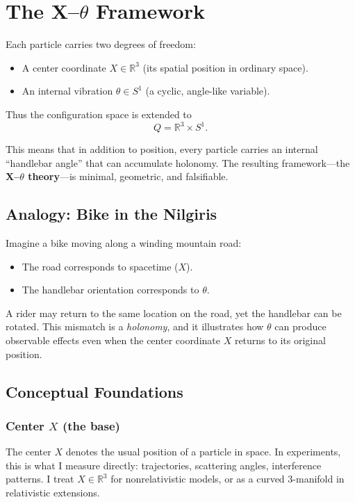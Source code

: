 \section{The X--$\theta$ Framework}

Each particle carries two degrees of freedom:
\begin{itemize}
  \item A center coordinate $X \in \mathbb{R}^3$ (its spatial position in ordinary space).
  \item An internal vibration $\theta \in S^1$ (a cyclic, angle-like variable).
\end{itemize}

Thus the configuration space is extended to
\begin{equation}
Q = \mathbb{R}^3 \times S^1 .
\end{equation}

This means that in addition to position, every particle carries an internal ``handlebar angle'' 
that can accumulate holonomy. The resulting framework---the \textbf{X--$\theta$ theory}---is minimal, geometric, 
and falsifiable.

\subsection{Analogy: Bike in the Nilgiris}
Imagine a bike moving along a winding mountain road:
\begin{itemize}
  \item The road corresponds to spacetime ($X$).
  \item The handlebar orientation corresponds to $\theta$.
\end{itemize}
A rider may return to the same location on the road, yet the handlebar can be rotated.
This mismatch is a \emph{holonomy}, and it illustrates how $\theta$ can produce observable
effects even when the center coordinate $X$ returns to its original position.  

\subsection{Conceptual Foundations}

\subsubsection*{Center $X$ (the base)}
The center $X$ denotes the usual position of a particle in space. In experiments, this is what
I measure directly: trajectories, scattering angles, interference patterns.  
I treat $X \in \mathbb{R}^3$ for nonrelativistic models, or as a curved 3-manifold in relativistic extensions.

